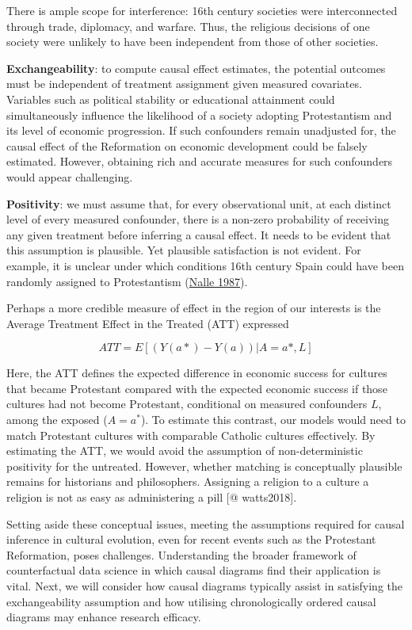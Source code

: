 \documentclass[
  singlecolumn]{report}
\begin{document}
There is ample scope for interference: 16th century societies were
interconnected through trade, diplomacy, and warfare. Thus, the
religious decisions of one society were unlikely to have been
independent from those of other societies.

\textbf{Exchangeability}: to compute causal effect estimates, the
potential outcomes must be independent of treatment assignment given
measured covariates. Variables such as political stability or
educational attainment could simultaneously influence the likelihood of
a society adopting Protestantism and its level of economic progression.
If such confounders remain unadjusted for, the causal effect of the
Reformation on economic development could be falsely estimated. However,
obtaining rich and accurate measures for such confounders would appear
challenging.

\textbf{Positivity}: we must assume that, for every observational unit,
at each distinct level of every measured confounder, there is a non-zero
probability of receiving any given treatment before inferring a causal
effect. It needs to be evident that this assumption is plausible. Yet
plausible satisfaction is not evident. For example, it is unclear under
which conditions 16th century Spain could have been randomly assigned to
Protestantism (\protect\hyperlink{ref-nalle1987}{Nalle 1987}).

Perhaps a more credible measure of effect in the region of our interests
is the Average Treatment Effect in the Treated (ATT) expressed

\[ATT = E[(Y(a*)- Y(a))|A = a*,L]\]

Here, the ATT defines the expected difference in economic success for
cultures that became Protestant compared with the expected economic
success if those cultures had not become Protestant, conditional on
measured confounders \(L\), among the exposed (\(A = a^*\)). To estimate
this contrast, our models would need to match Protestant cultures with
comparable Catholic cultures effectively. By estimating the ATT, we
would avoid the assumption of non-deterministic positivity for the
untreated. However, whether matching is conceptually plausible remains
for historians and philosophers. Assigning a religion to a culture a
religion is not as easy as administering a pill {[}@ watts2018{]}.

Setting aside these conceptual issues, meeting the assumptions required
for causal inference in cultural evolution, even for recent events such
as the Protestant Reformation, poses challenges. Understanding the
broader framework of counterfactual data science in which causal
diagrams find their application is vital. Next, we will consider how
causal diagrams typically assist in satisfying the exchangeability
assumption and how utilising chronologically ordered causal diagrams may
enhance research efficacy.
\end{document}
